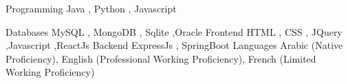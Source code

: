 

\begin{cvhonors}

  \cvhonor
    {Programming } %
    {Java , Python , Javascript} %
    {} %
    {} %

 \cvhonor
    {Databases } %
    {MySQL , MongoDB , Sqlite ,Oracle} %
    {} %
    {} %
 \cvhonor
    {Frontend } %
    {HTML , CSS , JQuery ,Javascript ,ReactJs} %
    {} %
    {} %
 \cvhonor
    {Backend } %
    {ExpressJs , SpringBoot } %
    {} %
    {} %
 \cvhonor
    {Languages } %
    {Arabic (Native Proficiency), English (Professional Working Proficiency), French (Limited Working Proficiency) } %
    {} %
    {} %

\end{cvhonors}
